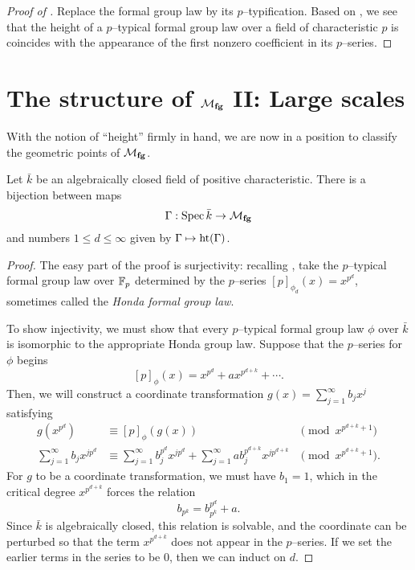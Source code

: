 \begin{proof}[{Proof of }]
Replace the formal group law by its $p$--typification.  Based on , we see that the height of a $p$--typical formal group law over a field of characteristic $p$ is coincides with the appearance of the first nonzero coefficient in its $p$--series.
\end{proof}










\section{The structure of $\mathcal{M}_{\mathbf{fg}}$ II: Large scales}

With the notion of ``height'' firmly in hand, we are now in a position to classify the geometric points of $\mathcal{M}_{\mathbf{fg}}$.

\begin{theorem}\label{FGpsOverAlgClosedFields}
Let $\bar k$ be an algebraically closed field of positive characteristic.  There is a bijection between maps \[\Gamma: \operatorname{Spec} \bar k \to \mathcal{M}_{\mathbf{fg}}\] and numbers $1 \le d \le \infty$ given by $\Gamma \mapsto \operatorname{ht}(\Gamma)$.
\end{theorem}
\begin{proof}
The easy part of the proof is surjectivity: recalling , take the $p$--typical formal group law over $\mathbb F_p$ determined by the $p$--series $[p]_{\phi_d}(x) = x^{p^d}$, sometimes called the \textit{Honda formal group law}.

To show injectivity, we must show that every $p$--typical formal group law $\phi$ over $\bar k$ is isomorphic to the appropriate Honda group law.  Suppose that the $p$--series for $\phi$ begins \[[p]_\phi(x) = x^{p^d} + a x^{p^{d+k}} + \cdots.\]  Then, we will construct a coordinate transformation $g(x) = \sum_{j=1}^\infty b_j x^j$ satisfying
\begin{align*}
g(x^{p^d}) & \equiv [p]_\phi(g(x)) & \pmod{x^{p^{d+k} + 1}} \\
\sum_{j=1}^\infty b_j x^{jp^d} & \equiv \sum_{j=1}^\infty b_j^{p^d} x^{jp^d} + \sum_{j=1}^\infty a b_j^{p^{d+k}} x^{jp^{d+k}} & \pmod{x^{p^{d+k} + 1}}.
\end{align*}
For $g$ to be a coordinate transformation, we must have $b_1 = 1$, which in the critical degree $x^{p^{d+k}}$ forces the relation \[b_{p^k} = b_{p^k}^{p^d} + a.\]  Since $\bar k$ is algebraically closed, this relation is solvable, and the coordinate can be perturbed so that the term $x^{p^{d+k}}$ does not appear in the $p$--series.  If we set the earlier terms in the series to be $0$, then we can induct on $d$.
\end{proof}

